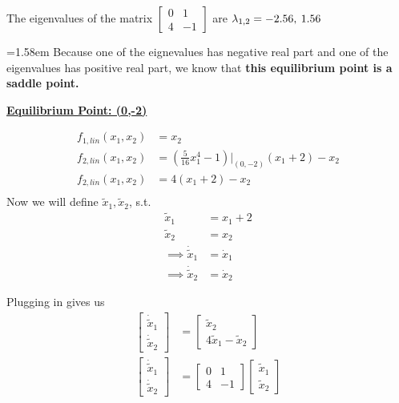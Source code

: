 \documentclass{article}
\begin{document}
  The eigenvalues of the matrix $\begin{bmatrix}
      0 & 1 \\
      4&  -1
  \end{bmatrix}$ are $\lambda_{1,2} = -2.56,\hspace{0.8mm}1.56$ \newline \newline
  
  \hangindent=1.58em
   Because one of the eignevalues has negative real part and one of
  the eigenvalues has positive real part, we know that \textbf{this
    equilibrium point is a saddle point.}
  \newpage
  
  \textbf{\underline{Equilibrium Point: (0,\hspace{0.8mm}-2)}}

  \begin{align*}
    f_{1, lin}(x_1,x_2) &= x_2 \\
    f_{2, lin}(x_1,x_2) &= (\frac{5}{16}x_1^4 -1)\bigg|_{(0,-2)}(x_1+2) - x_2 \\
    f_{2, lin}(x_1,x_2) &= 4(x_1+2) -x_2 \\
  \end{align*}
  \indent Now we will define $\tilde{x}_1, \tilde{x}_2$, s.t.
  \begin{align*}
    \tilde{x}_1 &= x_1+2 \\
    \tilde{x}_2 &= x_2 \\
    \implies \dot{\tilde{x}}_1 &= \dot{x}_1 \\
    \implies \dot{\tilde{x}}_2 &= \dot{x}_2
  \end{align*}
  
  \indent Plugging in gives us
  \begin{align*}
    \begin{bmatrix}
      \dot{\tilde{x}}_1 \\
      \dot{\tilde{x}}_2
    \end{bmatrix} &=
    \begin{bmatrix}
      \tilde{x}_2 \\
      4\tilde{x}_1 - \tilde{x}_2
    \end{bmatrix} \\
    \begin{bmatrix}
      \dot{\tilde{x}}_1 \\
      \dot{\tilde{x}}_2
    \end{bmatrix} &=
    \begin{bmatrix}
      0 & 1 \\
      4 & -1
    \end{bmatrix} 
    \begin{bmatrix}
      \tilde{x}_1 \\
      \tilde{x}_2
    \end{bmatrix} 
  \end{align*}
\end{document}
